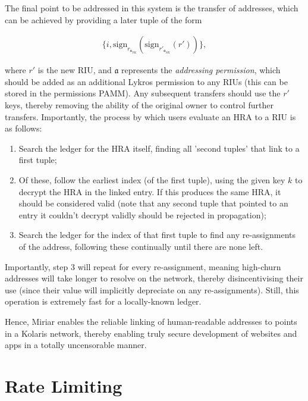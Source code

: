 \documentclass{extreport}
\begin{document}
The final point to be addressed in this system is the transfer of addresses, which can be achieved by providing a later tuple of the form

\begin{align*}
\{ i, \mathrm{sign}_{r_{\mathfrak{a}_{SK}}}(\mathrm{sign}_{r'_{\mathfrak{a}_{SK}}}(r')) \}, \tag{5.3}
\end{align*}

where \(r'\) is the new RIU, and \(\mathfrak{a}\) represents the \emph{addressing permission}, which should be added as an additional Lykros permission to any RIUs (this can be stored in the permissions PAMM). Any subsequent transfers should use the \(r'\) keys, thereby removing the ability of the original owner to control further transfers. Importantly, the process by which users evaluate an HRA to a RIU is as follows:

\begin{enumerate}
\item Search the ledger for the HRA itself, finding all 'second tuples' that link to a first tuple;
\item Of these, follow the earliest index (of the first tuple), using the given key \(k\) to decrypt the HRA in the linked entry. If this produces the same HRA, it should be considered valid (note that any second tuple that pointed to an entry it couldn't decrypt validly should be rejected in propagation);
\item Search the ledger for the index of that first tuple to find any re-assignments of the address, following these continually until there are none left.
\end{enumerate}

Importantly, step 3 will repeat for every re-assignment, meaning high-churn addresses will take longer to resolve on the network, thereby disincentivising their use (since their value will implicitly depreciate on any re-assignments). Still, this operation is extremely fast for a locally-known ledger.

Hence, Miriar enables the reliable linking of human-readable addresses to points in a Kolaris network, thereby enabling truly secure development of websites and apps in a totally uncensorable manner.

\chapter{Rate Limiting}
\label{sec:org9f56f8d}
\end{document}
